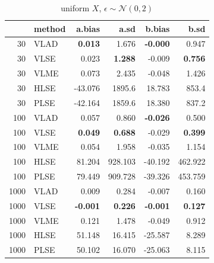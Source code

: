 \documentclass[twoside]{article}
\begin{document}
\begin{table}[ht]
\centering
\caption{uniform $X$, $\epsilon \sim \mathcal{N}(0,2)$}
\begin{tabular}{rlrrrr}
  \hline
 & method & a.bias & a.sd & b.bias & b.sd \\ 
  \hline
  30 & VLAD & \textbf{0.013} & 1.676 & \textbf{-0.000} & 0.947 \\ 
  30 & VLSE & 0.023 & \textbf{1.288} & -0.009 & \textbf{0.756} \\ 
  30 & VLME & 0.073 & 2.435 & -0.048 & 1.426 \\ 
  30 & HLSE & -43.076 & 1895.6 & 18.783 & 853.4 \\ 
  30 & PLSE & -42.164 & 1859.6 & 18.380 & 837.2 \\ 
  \hline
  100 & VLAD & 0.057 & 0.860 & \textbf{-0.026} & 0.500 \\ 
  100 & VLSE & \textbf{0.049} & \textbf{0.688} & -0.029 & \textbf{0.399} \\ 
  100 & VLME & 0.054 & 1.958 & -0.035 & 1.154 \\ 
  100 & HLSE & 81.204 & 928.103 & -40.192 & 462.922 \\ 
  100 & PLSE & 79.449 & 909.728 & -39.326 & 453.759 \\ 
  \hline
  1000 & VLAD & 0.009 & 0.284 & -0.007 & 0.160 \\ 
  1000 & VLSE & \textbf{-0.001} & \textbf{0.226} & \textbf{-0.001} & \textbf{0.127} \\ 
  1000 & VLME & 0.121 & 1.478 & -0.049 & 0.912 \\ 
  1000 & HLSE & 51.148 & 16.415 & -25.587 & 8.289 \\ 
  1000 & PLSE & 50.102 & 16.070 & -25.063 & 8.115 \\ 
  \hline
\end{tabular}
\end{table}
\end{document}
